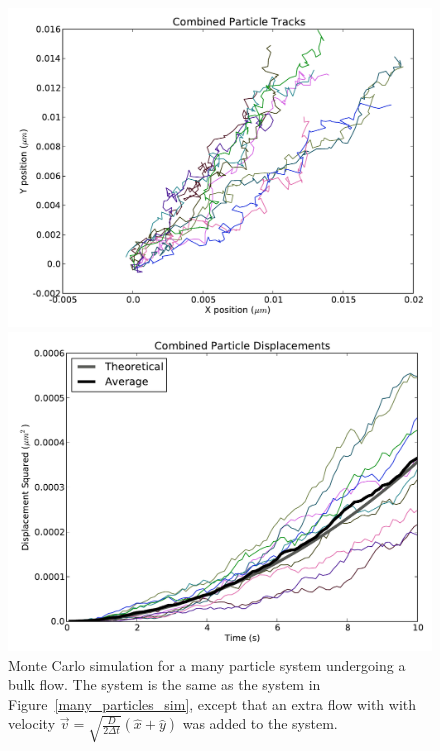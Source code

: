\documentclass[11pt,letterpaper]{article}
\begin{document}
\begin{figure}
    \centering
    \begin{minipage}[t]{0.485\textwidth}
        \centering
        \includegraphics[width=\textwidth]{figures/mpbulk_track.pdf}
    \end{minipage}
    \begin{minipage}[t]{0.485\textwidth}
        \centering
        \includegraphics[width=\textwidth]{figures/mpbulk_dispsq.pdf}
    \end{minipage}
    \caption{Monte Carlo simulation for a many particle system undergoing a bulk
    flow. The system is the same as the system in
    Figure~\ref{many_particles_sim}, except that an extra flow with with
    velocity $\vec{v} = \sqrt{\frac{D}{2\Delta t}}
    \left(\hat{x} + \hat{y}\right)$ was added to the system.}
    \label{mpbulk_sim}
\end{figure}
\end{document}
